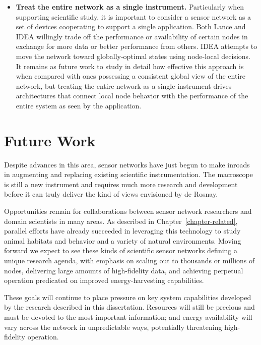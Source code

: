 \begin{itemize}
\item \textbf{Treat the entire network as a single instrument.} Particularly
when supporting scientific study, it is important to consider a sensor
network as a set of devices cooperating to support a single application. Both
Lance and IDEA willingly trade off the performance or availability of certain
nodes in exchange for more data or better performance from others. IDEA
attempts to move the network toward globally-optimal states using node-local
decisions. It remains as future work to study in detail how effective this
approach is when compared with ones possessing a consistent global view of
the entire network, but treating the entire network as a single instrument
drives architectures that connect local node behavior with the performance of
the entire system as seen by the application.

\end{itemize}

\section{Future Work}

Despite advances in this area, sensor networks have just begun to make
inroads in augmenting and replacing existing scientific instrumentation. The
macroscope is still a new instrument and requires much more research and
development before it can truly deliver the kind of views envisioned by de
Rosnay.

Opportunities remain for collaborations between sensor network researchers
and domain scientists in many areas. As described in
Chapter~\ref{chapter-related}, parallel efforts have already succeeded in
leveraging this technology to study animal habitats and behavior and a
variety of natural environments. Moving forward we expect to see these kinds
of scientific sensor networks defining a unique research agenda, with
emphasis on scaling out to thousands or millions of nodes, delivering large
amounts of high-fidelity data, and achieving perpetual operation predicated
on improved energy-harvesting capabilities.

These goals will continue to place pressure on key system capabilities
developed by the research described in this dissertation. Resources will
still be precious and must be devoted to the most important information; and
energy availability will vary across the network in unpredictable ways,
potentially threatening high-fidelity operation.

